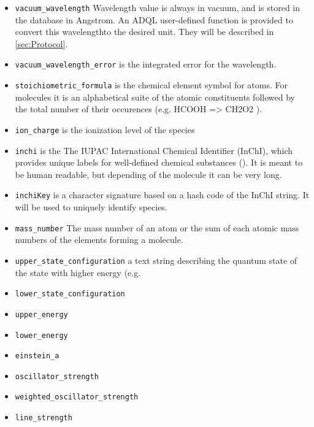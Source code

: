 \documentclass[11pt,a4paper]{ivoa}
\begin{document}
\begin{itemize}
\item \texttt{vacuum\_wavelength} 
Wavelength value is always in vacuum, and  is stored in the database in
Angstrom.  An  ADQL user-defined function is provided to convert this
wavelengthto the desired unit. They will be described in
\ref{sec:Protocol}.

\item \texttt{vacuum\_wavelength\_error} is the integrated error for the wavelength.

\item \texttt{stoichiometric\_formula} is the chemical element symbol
for atoms. For molecules it is an alphabetical suite of the atomic
constituents followed by the total number of their occurences (e.g.
HCOOH => CH2O2 ).

\item \texttt{ion\_charge} is the ionization level of the species

\item \texttt{inchi} is the The IUPAC International Chemical Identifier
(InChI), which  provides unique labels for well-defined chemical
substances (\cite{INCHI}). It is meant to be human readable, but
depending of the molecule it can be very long.

\item \texttt{inchiKey} is a character signature based on a hash code of
the InChI string. It will be used to uniquely identify species.

\item \texttt{mass\_number} The mass number of an atom or the sum of
each atomic mass numbers of the elements forming a molecule.

\item \texttt{upper\_state\_configuration} a text string describing the
quantum state of the state with higher energy (e.g. 
\item \texttt{lower\_state\_configuration} 
\item \texttt{upper\_energy} 
\item \texttt{lower\_energy} 

\item \texttt{einstein\_a}
\item \texttt{oscillator\_strength}
\item \texttt{weighted\_oscillator\_strength}
\item \texttt{line\_strength}

\end{itemize}
\end{document}
